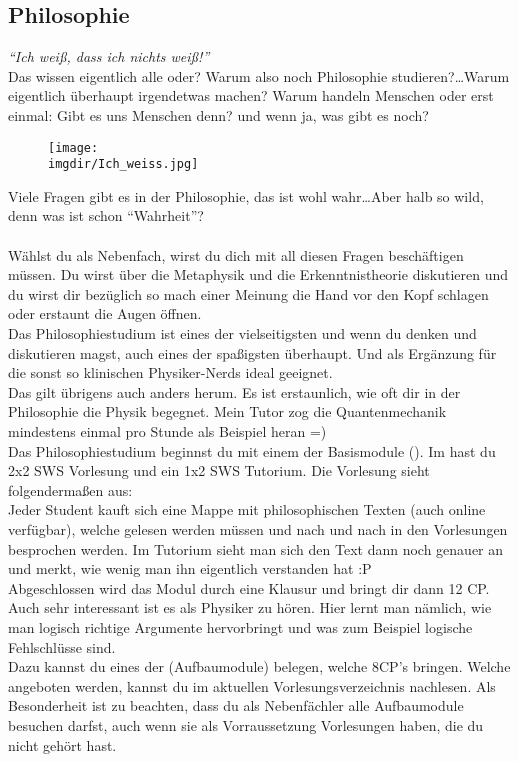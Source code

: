 \subsection{Philosophie}
\label{subsec:philosophie}
\textit{\enquote{Ich wei\ss , dass ich nichts wei\ss !}}\\
Das wissen eigentlich alle oder? Warum also noch Philosophie studieren?\ldots Warum eigentlich \"uberhaupt irgendetwas machen? Warum handeln Menschen oder erst einmal: Gibt es uns Menschen denn? und wenn ja, was gibt es noch?
\begin{figure}[!b]
  	\centering
	\texttt{[image: \\imgdir/Ich\_weiss.jpg]}
\end{figure}
Viele Fragen gibt es in der Philosophie, das ist wohl wahr\ldots Aber halb so wild, denn was ist schon \enquote{Wahrheit}?\\\\
W\"ahlst du  als Nebenfach, wirst du dich mit all diesen Fragen besch\"aftigen m\"ussen. Du wirst \"uber die Metaphysik und die Erkenntnistheorie diskutieren und du wirst dir bez\"uglich so mach einer Meinung die Hand vor den Kopf schlagen oder erstaunt die Augen \"offnen.\\
Das Philosophiestudium ist eines der vielseitigsten und wenn du denken und diskutieren magst, auch eines der spa\ss igsten \"uberhaupt. Und als Erg\"anzung f\"ur die sonst so klinischen Physiker-Nerds ideal geeignet.\\
Das gilt \"ubrigens auch anders herum. Es ist erstaunlich, wie oft dir in der Philosophie die Physik begegnet. Mein Tutor zog die Quantenmechanik mindestens einmal pro Stunde als Beispiel heran =)\\
Das Philosophiestudium beginnst du mit einem der Basismodule ().
Im  hast du 2x2 SWS Vorlesung und ein 1x2 SWS Tutorium.
Die Vorlesung sieht folgenderma\ss en aus:\\
Jeder Student kauft sich eine Mappe mit philosophischen Texten (auch online verf\"ugbar), welche gelesen werden m\"ussen und nach und nach in den Vorlesungen besprochen werden. Im Tutorium sieht man sich den Text dann noch genauer an und merkt, wie wenig man ihn eigentlich verstanden hat :P\\
Abgeschlossen wird das Modul durch eine Klausur und bringt dir dann 12 CP.\\
Auch sehr interessant ist es als Physiker  zu h\"oren. Hier lernt man n\"amlich, wie man logisch richtige Argumente hervorbringt und was zum Beispiel logische Fehlschl\"usse sind.\\
Dazu kannst du eines der  (Aufbaumodule) belegen, welche 8CP's bringen. Welche  angeboten werden, kannst du im aktuellen Vorlesungsverzeichnis nachlesen. Als Besonderheit ist zu beachten, dass du als Nebenf\"achler alle Aufbaumodule besuchen darfst, auch wenn sie als Vorraussetzung Vorlesungen haben, die du nicht geh\"ort hast.

